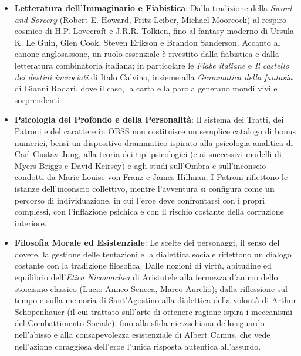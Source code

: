 \begin{itemize}[noitemsep, topsep=2pt, parsep=2pt, partopsep=0pt, leftmargin=1.5em]
	\item \textbf{Letteratura dell'Immaginario e Fiabistica}: Dalla tradizione della \emph{Sword and Sorcery} (Robert E. Howard, Fritz Leiber, Michael Moorcock) al respiro cosmico di H.P. Lovecraft e J.R.R. Tolkien, fino al fantasy moderno di Ursula K. Le Guin, Glen Cook, Steven Erikson e Brandon Sanderson. Accanto al canone anglosassone, un ruolo essenziale è rivestito dalla fiabistica e dalla letteratura combinatoria italiana; in particolare le \emph{Fiabe italiane} e \emph{Il castello dei destini incrociati} di Italo Calvino, insieme alla \emph{Grammatica della fantasia} di Gianni Rodari, dove il caso, la carta e la parola generano mondi vivi e sorprendenti.

	\item \textbf{Psicologia del Profondo e della Personalità}: Il sistema dei Tratti, dei Patroni e del carattere in OBSS non costituisce un semplice catalogo di bonus numerici, bensì un dispositivo drammatico ispirato alla psicologia analitica di Carl Gustav Jung, alla teoria dei tipi psicologici (e ai successivi modelli di Myers-Briggs e David Keirsey) e agli studi sull'Ombra e sull'inconscio condotti da Marie-Louise von Franz e James Hillman. I Patroni riflettono le istanze dell'inconscio collettivo, mentre l'avventura si configura come un percorso di individuazione, in cui l'eroe deve confrontarsi con i propri complessi, con l'inflazione psichica e con il rischio costante della corruzione interiore.

	\item \textbf{Filosofia Morale ed Esistenziale}: Le scelte dei personaggi, il senso del dovere, la gestione delle tentazioni e la dialettica sociale riflettono un dialogo costante con la tradizione filosofica. Dalle nozioni di virtù, abitudine ed equilibrio dell'\emph{Etica Nicomachea} di Aristotele alla fermezza d'animo dello stoicismo classico (Lucio Anneo Seneca, Marco Aurelio); dalla riflessione sul tempo e sulla memoria di Sant'Agostino alla dialettica della volontà di Arthur Schopenhauer (il cui trattato sull'arte di ottenere ragione ispira i meccanismi del Combattimento Sociale); fino alla sfida nietzschiana dello sguardo nell'abisso e alla consapevolezza esistenziale di Albert Camus, che vede nell'azione coraggiosa dell'eroe l'unica risposta autentica all'assurdo.


\end{itemize}

